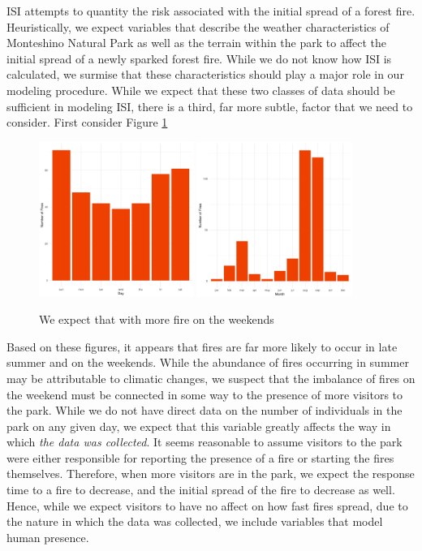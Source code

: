\documentclass{article}
\begin{document}
ISI attempts to quantity the risk associated with the initial spread of a forest fire. Heuristically, we expect variables that describe the weather characteristics of Monteshino Natural Park as well as the terrain within the park to affect the initial spread of a newly sparked forest fire. While we do not know how ISI is calculated, we surmise that these characteristics should play a major role in our modeling procedure. While we expect that these two classes of data should be sufficient in modeling ISI, there is a third, far more subtle, factor that we need to consider. First consider Figure \ref{fig:human_factor}
\begin{figure}[h!]
\centering
\includegraphics[width=0.45\textwidth]{day_bar.pdf}
\includegraphics[width=0.45\textwidth]{month_bar.pdf}
\caption{We expect that with more fire on the weekends }
\label{fig:human_factor}{}
\end{figure}
Based on these figures, it appears that fires are far more likely to occur in late summer and on the weekends. While the abundance of fires occurring in summer may be attributable to climatic changes, we suspect that the imbalance of fires on the weekend must be connected in some way to the presence of more visitors to the park. While we do not have direct data on the number of individuals in the park on any given day, we expect that this variable greatly affects the way in which \textit{the data was collected}. It seems reasonable to assume visitors to the park were either responsible for reporting the presence of a fire or starting the fires themselves. Therefore, when more visitors are in the park, we expect the response time to a fire to decrease, and the initial spread of the fire to decrease as well. Hence, while we expect visitors to have no affect on how fast fires spread, due to the nature in which the data was collected, we include variables that model human presence.  
\end{document}

